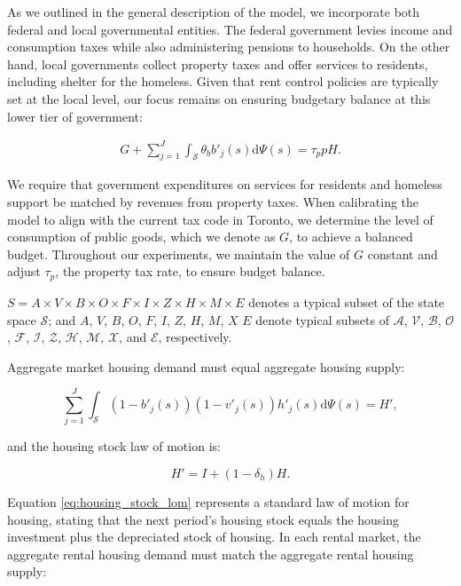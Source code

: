 \documentclass[parskip=full]{article}
\begin{document}
As we outlined in the general description of the model, we incorporate both federal and local governmental entities. The federal government levies income and consumption taxes while also administering pensions to households. On the other hand, local governments collect property taxes and offer services to residents, including shelter for the homeless. Given that rent control policies are typically set at the local level, our focus remains on ensuring budgetary balance at this lower tier of government:

\begin{align}\label{eq:gbc}
  G + \sum_{j=1}^J \int_\mathcal{S} \theta_{b} b'_{j}(s)\mathrm{d}\Psi(s)  = \tau_{p} p H.
\end{align}

\noindent We require that government expenditures on services for residents and homeless support be matched by revenues from property taxes. When calibrating the model to align with the current tax code in Toronto, we determine the level of consumption of public goods, which we denote as $G$, to achieve a balanced budget. Throughout our experiments, we maintain the value of $G$ constant and adjust $\tau_{p}$, the property tax rate, to ensure budget balance.

$S=A\times V\times B\times O \times F \times I \times Z \times H\times M\times E$ denotes a typical subset of the state space $\mathcal{S}$; and $A$, $V$, $B$, $O$, $F$, $I$, $Z$, $H$, $M$, $X$ $E$ denote typical subsets of $\mathcal{A}$, $\mathcal{V}$, $\mathcal{B}$, $\mathcal{O}$, $\mathcal{F}$, $\mathcal{I}$, $\mathcal{Z}$, $\mathcal{H}$, $\mathcal{M}$, $\mathcal{X}$, and $\mathcal{E}$, respectively.

Aggregate market housing demand must equal aggregate housing supply:

\begin{equation}
\label{eq:housing_clearing_condition}
  \sum_{j=1}^J \int_\mathcal{S} (1-b'_{j}(s))(1-v'_{j}(s)) h'_{j}(s) \mathrm{d}\Psi(s) = H',
\end{equation}

\noindent and the housing stock law of motion is: 

\begin{equation}\label{eq:housing_stock_lom}
H'=I+(1-\delta_h)H.
\end{equation}


\noindent Equation \eqref{eq:housing_stock_lom} represents a standard law of motion for housing, stating that the next period's housing stock equals the housing investment plus the depreciated stock of housing. In each rental market, the aggregate rental housing demand must match the aggregate rental housing supply:
\end{document}

